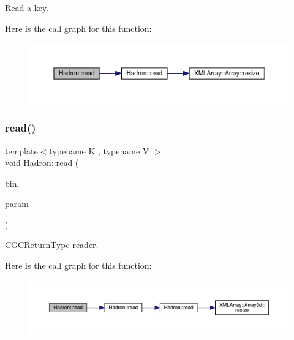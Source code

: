 Read a key. 

Here is the call graph for this function\+:
\nopagebreak
\begin{figure}[H]
\begin{center}
\leavevmode
\includegraphics[width=350pt]{d1/daf/namespaceHadron_a0651834c5f37836ea0e1e081b4214546_cgraph}
\end{center}
\end{figure}
\mbox{\label{namespaceHadron_a28b215f1b16c66c9862495bf8c11084f}} 
\subsubsection{\texorpdfstring{read()}{read()}\hspace{0.1cm}{\footnotesize\ttfamily [28/94]}}
{\footnotesize\ttfamily template$<$typename K , typename V $>$ \\
void Hadron\+::read (\begin{DoxyParamCaption}\item[{\mbox{\hyperlink{classADATIO_1_1BinaryReader}{Binary\+Reader}} \&}]{bin,  }\item[{\mbox{\hyperlink{structHadron_1_1CGCReturnType}{C\+G\+C\+Return\+Type}}$<$ K, V $>$ \&}]{param }\end{DoxyParamCaption})\hspace{0.3cm}{\ttfamily [inline]}}



\mbox{\hyperlink{structHadron_1_1CGCReturnType}{C\+G\+C\+Return\+Type}} reader. 

Here is the call graph for this function\+:
\nopagebreak
\begin{figure}[H]
\begin{center}
\leavevmode
\includegraphics[width=350pt]{d1/daf/namespaceHadron_a28b215f1b16c66c9862495bf8c11084f_cgraph}
\end{center}
\end{figure}
\mbox{\label{namespaceHadron_ac70286e9fd2f4a9ddf81f9235d1812e8}} 
